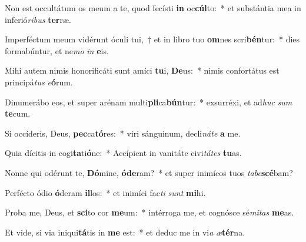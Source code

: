 \item Non est occultátum os meum a te, quod fecísti \textbf{in} oc\textbf{cúl}to:~* et substántia mea in inferió\textit{ri}\textit{bus} \textbf{ter}ræ.
\item Imperféctum meum vidérunt óculi tui,~† et in libro tuo \textbf{om}nes scri\textbf{bén}tur:~* dies formabúntur, et ne\textit{mo} \textit{in} \textbf{e}is.
\item Mihi autem nimis honorificáti sunt amíci \textbf{tu}i, \textbf{De}us:~* nimis confortátus est principá\textit{tus} \textit{e}\textbf{ó}rum.
\item Dinumerábo eos, et super arénam multi\textbf{pli}ca\textbf{bún}tur:~* exsurréxi, et ad\textit{huc} \textit{sum} \textbf{te}cum.
\item Si occíderis, Deus, \textbf{pec}ca\textbf{tó}res:~* viri sánguinum, decli\textit{ná}\textit{te} \textbf{a} me.
\item Quia dícitis in cogi\textbf{ta}ti\textbf{ó}ne:~* Accípient in vanitáte civi\textit{tá}\textit{tes} \textbf{tu}as.
\item Nonne qui odérunt te, \textbf{Dó}mine, \textbf{ó}\textbf{de}ram?~* et super inimícos tuos \textit{ta}\textit{be}\textbf{scé}bam?
\item Perfécto ódio \textbf{ó}deram \textbf{il}los:~* et inimíci fac\textit{ti} \textit{sunt} \textbf{mi}hi.
\item Proba me, Deus, et \textbf{sci}to cor \textbf{me}um:~* intérroga me, et cognósce sé\textit{mi}\textit{tas} \textbf{me}as.
\item Et vide, si via iniqui\textbf{tá}tis in \textbf{me} est:~* et deduc me in vi\textit{a} \textit{æ}\textbf{tér}na.
